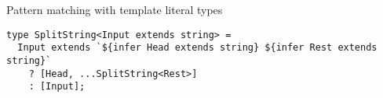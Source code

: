 \begin{listing}[ht]
  \caption{Pattern matching with template literal types}\label{lst:pattern-matching-template-literal}
  \begin{verbatim}
type SplitString<Input extends string> = 
  Input extends `${infer Head extends string} ${infer Rest extends string}`
    ? [Head, ...SplitString<Rest>]
    : [Input];
\end{verbatim}
\end{listing}
